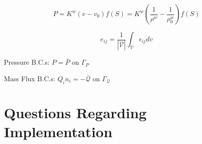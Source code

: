 \documentclass[11pt]{article} %
\begin{document}
\begin{equation}
	P = K^w \left( v - v_0 \right) f(S) =  K^w \left( \frac{1}{\rho^w} - \frac{1}{\rho^w_0} \right) f(S)
\end{equation}

\begin{equation}
	e_{ij} = \frac{1}{|\bar{\mathcal{V}}|} \int_{\bar{\mathcal{V}}} \epsilon_{ij} dv
\end{equation}

Pressure B.C.s: $P = \bar{P}$ on $\Gamma_P$

Mass Flux B.C.s: $Q_i n_i = -\bar{\mathcal{Q}}$ on $\Gamma_\mathcal{Q}$

\newpage

\section{Questions Regarding Implementation}
\end{document}

